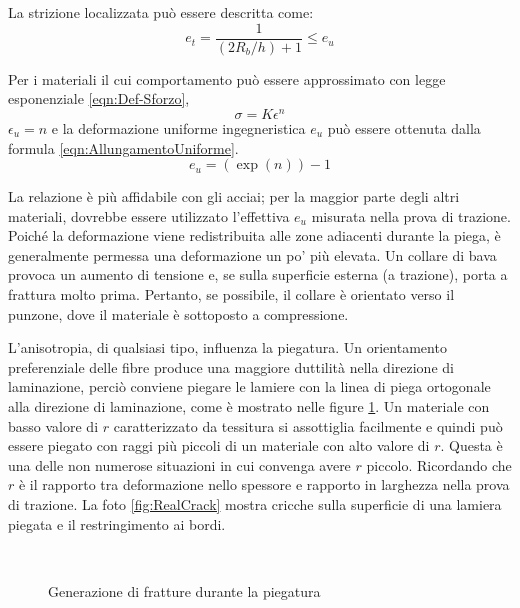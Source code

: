 La strizione localizzata può essere descritta come:
\begin{equation}
e_t = \frac{1}{(2R_b / h) + 1} \leq e_u
\label{eqn:StrizLocal}
\end{equation}

Per i materiali il cui comportamento può essere approssimato con legge esponenziale \eqref{eqn:Def-Sforzo}, 
\begin{equation}
\sigma = K \epsilon^n
\label{eqn:Def-Sforzo}
\end{equation}
$\epsilon_u = n$ e la deformazione uniforme ingegneristica $e_u$ può essere ottenuta dalla formula \eqref{eqn:AllungamentoUniforme}.
\begin{equation}
e_u = \left(\exp(n)\right) - 1
\label{eqn:AllungamentoUniforme}
\end{equation}

La relazione è più affidabile con gli acciai; per la maggior parte degli altri materiali, dovrebbe essere utilizzato l'effettiva $e_u$ misurata nella prova di trazione.
Poiché la deformazione viene redistribuita alle zone adiacenti durante la piega, è generalmente permessa una deformazione un po' più elevata.
Un collare di bava provoca un aumento di tensione e, se sulla superficie esterna (a trazione), porta a frattura molto prima. Pertanto, se possibile, il collare è orientato verso il punzone, dove il materiale è sottoposto a compressione.

L'anisotropia, di qualsiasi tipo, influenza la piegatura. Un orientamento preferenziale delle fibre produce una maggiore duttilità nella direzione di laminazione, perciò conviene piegare le lamiere con la linea di piega ortogonale alla direzione di laminazione, come è mostrato nelle figure \ref{fig:BendCracked}.
Un materiale con basso valore di $r$ caratterizzato da tessitura si assottiglia facilmente e quindi può essere piegato con raggi più piccoli di un materiale con alto valore di $r$. Questa è una delle non numerose situazioni in cui convenga avere $r$ piccolo. Ricordando che $r$ è il rapporto tra deformazione nello spessore e rapporto in larghezza nella prova di trazione. La foto \ref{fig:RealCrack} mostra cricche sulla superficie di una lamiera piegata e il restringimento ai bordi.

\begin{figure}
\centering
{}\quad
{}\\
\caption{Generazione di fratture durante la piegatura}
\label{fig:BendCracked}
\end{figure}

